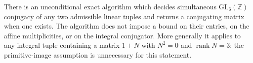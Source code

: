 \begin{theorem}\hypertarget{tag-02NR}{}\label{maps:src:F.2.36}


There is an unconditional exact algorithm which decides simultaneous
$\mathrm{GL}_6(\mathbb Z)$ conjugacy of any two admissible linear tuples and returns a conjugating matrix when one exists. The algorithm
does not impose a bound on their entries, on the affine multiplicities,
or on the integral conjugator. More generally it applies to any integral
tuple containing a matrix $1+N$ with $N^2=0$ and $\operatorname{rank}N=3$;
the primitive-image assumption is unnecessary for this statement.

\end{theorem}


